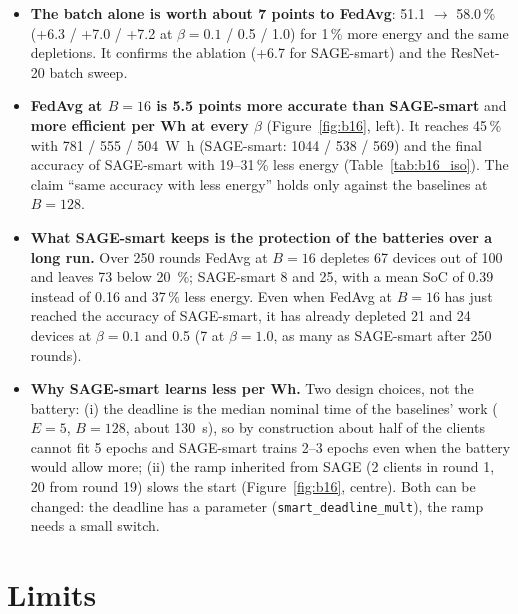 \documentclass[11pt,a4paper]{article}
\begin{document}
\begin{itemize}
  \item \textbf{The batch alone is worth about 7 points to FedAvg}: 51.1 $\to$
        58.0\,\% (+6.3 / +7.0 / +7.2 at $\beta=0.1$ / 0.5 / 1.0) for 1\,\%
        more energy and the same depletions. It confirms the ablation (+6.7
        for SAGE-smart) and the ResNet-20 batch sweep.
  \item \textbf{FedAvg at $B=16$ is 5.5 points more accurate than
        SAGE-smart} and \textbf{more efficient per Wh at every $\beta$}
        (Figure~\ref{fig:b16}, left). It reaches 45\,\% with 781 / 555 /
        \SI{504}{\watt\hour} (SAGE-smart: 1044 / 538 / 569) and the final
        accuracy of SAGE-smart with 19--31\,\% less energy
        (Table~\ref{tab:b16_iso}). The claim ``same accuracy with less
        energy'' holds only against the baselines at $B=128$.
  \item \textbf{What SAGE-smart keeps is the protection of the batteries
        over a long run.} Over 250 rounds FedAvg at $B=16$ depletes 67 devices
        out of 100 and leaves 73 below \SI{20}{\percent}; SAGE-smart 8 and
        25, with a mean SoC of 0.39 instead of 0.16 and 37\,\% less energy.
        Even when FedAvg at $B=16$ has just reached the accuracy of
        SAGE-smart, it has already depleted 21 and 24 devices at $\beta=0.1$
        and 0.5 (7 at $\beta=1.0$, as many as SAGE-smart after 250 rounds).
  \item \textbf{Why SAGE-smart learns less per Wh.} Two design choices, not
        the battery: (i) the deadline is the median nominal time of the
        baselines' work ($E=5$, $B=128$, about \SI{130}{\second}), so by
        construction about half of the clients cannot fit 5 epochs and
        SAGE-smart trains 2--3 epochs even when the battery would allow more;
        (ii) the ramp inherited from SAGE (2 clients in round 1, 20 from round
        19) slows the start (Figure~\ref{fig:b16}, centre). Both can be
        changed: the deadline has a parameter (\texttt{smart\_deadline\_mult}),
        the ramp needs a small switch.
\end{itemize}

\section{Limits}
\end{document}
